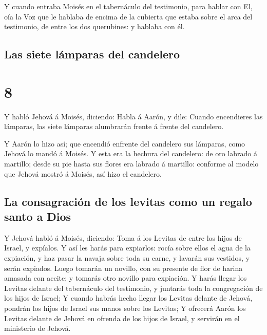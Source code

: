  Y cuando entraba Moisés en el tabernáculo del
testimonio, para hablar con El, oía la Voz que le hablaba de encima de
la cubierta que estaba sobre el arca del testimonio, de entre los dos
querubines: y hablaba con él.

\hypertarget{las-siete-luxe1mparas-del-candelero}{%
\subsection{Las siete lámparas del
candelero}\label{las-siete-luxe1mparas-del-candelero}}

\hypertarget{section-7}{%
\section{8}\label{section-7}}

 Y habló Jehová á Moisés, diciendo:  Habla á
Aarón, y dile: Cuando encendieres las lámparas, las siete lámparas
alumbrarán frente á frente del candelero.

 Y Aarón lo hizo así; que encendió enfrente del candelero
sus lámparas, como Jehová lo mandó á Moisés.  Y esta era
la hechura del candelero: de oro labrado á martillo; desde su pie hasta
sus flores era labrado á martillo: conforme al modelo que Jehová mostró
á Moisés, así hizo el candelero.

\hypertarget{la-consagraciuxf3n-de-los-levitas-como-un-regalo-santo-a-dios}{%
\subsection{La consagración de los levitas como un regalo santo a
Dios}\label{la-consagraciuxf3n-de-los-levitas-como-un-regalo-santo-a-dios}}

 Y Jehová habló á Moisés, diciendo:  Toma á
los Levitas de entre los hijos de Israel, y expíalos.  Y
así les harás para expiarlos: rocía sobre ellos el agua de la expiación,
y haz pasar la navaja sobre toda su carne, y lavarán sus vestidos, y
serán expiados.  Luego tomarán un novillo, con su presente
de flor de harina amasada con aceite; y tomarás otro novillo para
expiación.  Y harás llegar los Levitas delante del
tabernáculo del testimonio, y juntarás toda la congregación de los hijos
de Israel;  Y cuando habrás hecho llegar los Levitas
delante de Jehová, pondrán los hijos de Israel sus manos sobre los
Levitas;  Y ofrecerá Aarón los Levitas delante de Jehová
en ofrenda de los hijos de Israel, y servirán en el ministerio de
Jehová.


